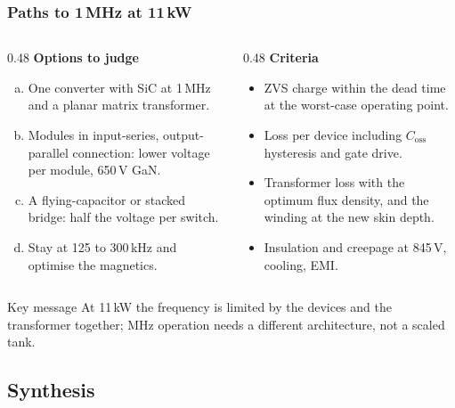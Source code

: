 \begin{frame}
	\frametitle{Paths to 1\,MHz at 11\,kW}
	\begin{columns}[T]
		\begin{column}{0.48\textwidth}
			\small
			\textbf{Options to judge}
			\begin{enumerate}[(a)]
				\item One converter with SiC at 1\,MHz and a planar matrix transformer.
				\item Modules in input-series, output-parallel connection: lower voltage per module, 650\,V GaN.
				\item A flying-capacitor or stacked bridge: half the voltage per switch.
				\item Stay at 125 to 300\,kHz and optimise the magnetics.
			\end{enumerate}
		\end{column}
		\begin{column}{0.48\textwidth}
			\small
			\textbf{Criteria}
			\begin{itemize}
				\item ZVS charge within the dead time at the worst-case operating point.
				\item Loss per device including $C_\mathrm{oss}$ hysteresis and gate drive.
				\item Transformer loss with the optimum flux density, and the winding at the new skin depth.
				\item Insulation and creepage at 845\,V, cooling, EMI.
			\end{itemize}
		\end{column}
	\end{columns}
	\begin{block}{Key message}
		At 11\,kW the frequency is limited by the devices and the transformer together; MHz operation needs a different architecture, not a scaled tank.
	\end{block}
\end{frame}

\subsection{Synthesis}


